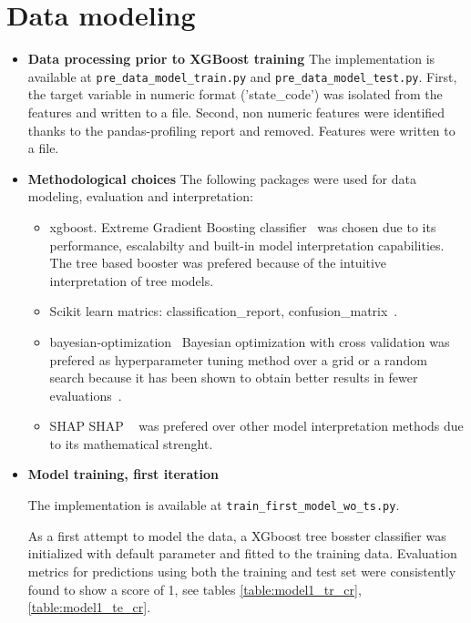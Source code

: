 \documentclass{article}
\begin{document}
\section{Data modeling}
\label{sec:model}
\begin{itemize}
\item \textbf{Data processing prior to XGBoost training}
The implementation is available at {\tt pre\_data\_model\_train.py} and {\tt pre\_data\_model\_test.py}.
First, the target variable in numeric format ('state\_code') was isolated from the features and written to a file.
Second, non numeric features were identified thanks to the pandas-profiling report and removed. Features were written to a file.

\item \textbf{Methodological choices}
The following packages were used for data modeling, evaluation and interpretation:
\begin{itemize}
	\item xgboost.
	Extreme Gradient Boosting classifier~\cite{DBLP:journals/corr/ChenG16} was chosen due to its performance, escalabilty and built-in model interpretation capabilities.
The tree based booster was prefered because of the intuitive interpretation of tree models.
	\item Scikit learn matrics: classification\_report, confusion\_matrix~\cite{pedregosa2011scikit}.
	\item bayesian-optimization~\cite{nogueiraBayOpt}
	Bayesian optimization with cross validation was prefered as hyperparameter tuning method over a grid or a random search because it has been shown to obtain better results in fewer evaluations~\cite{snoek2012practical, NIPS2011_4443}.

	\item SHAP
	SHAP ~\cite{DBLP:journals/corr/LundbergL17, lundberg2020local2global} was prefered over other model interpretation methods due to its mathematical strenght.
\end{itemize}

\item \textbf{Model training, first iteration}

The implementation is available at {\tt train\_first\_model\_wo\_ts.py}.

As a first attempt to model the data, a XGboost tree bosster classifier was initialized with default parameter and fitted to the training data. Evaluation metrics for predictions using both the training and test set were consistently found to show a score of 1, see tables \ref{table:model1_tr_cr}, \ref{table:model1_te_cr}.


\end{itemize}
\end{document}
